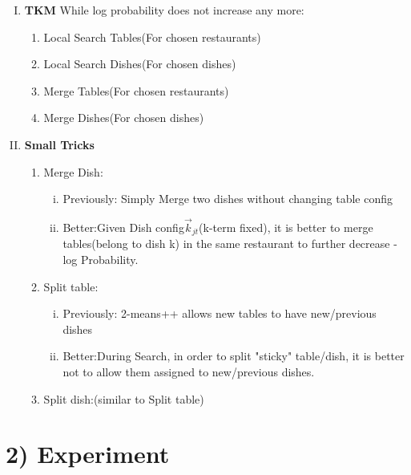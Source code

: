 \documentclass{article}
\begin{document}
\begin{spacing}{1.1}
\begin{enumerate}[(I)]
\begin{enumerate}[(a)]
\end{enumerate}
\item {\bf TKM}
While log probability does not increase any more:
\begin{enumerate}[(1)]
\item Local Search Tables(For chosen restaurants)
\item Local Search Dishes(For chosen dishes)
\item Merge Tables(For chosen restaurants)
\item Merge Dishes(For chosen dishes)
\end{enumerate}

\item {\bf Small Tricks}
\begin{enumerate}[(1)]
\item Merge Dish:
\begin{enumerate}[(i)]
\item Previously: Simply Merge two dishes without changing table config
\item Better:Given Dish config$\vec k_{jt}$(k-term fixed), it is better to merge tables(belong to dish k) in the same restaurant to further decrease -log Probability.
\end{enumerate}
\item Split table:
\begin{enumerate}[(i)]
\item Previously: 2-means++ allows new tables to have new/previous dishes
\item Better:During Search, in order to split "sticky" table/dish, it is better not to allow them assigned to new/previous dishes.
\end{enumerate}
\item Split dish:(similar to Split table) 
\end{enumerate}
\end{enumerate}



\section{2) Experiment}

\end{spacing}
\end{document}
